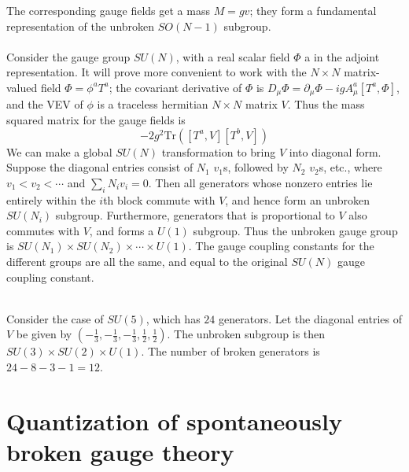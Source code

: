 \documentclass[cyan]{elegantnote}
\begin{document}
The corresponding gauge fields get a mass $M = gv$; they form a fundamental representation of the unbroken $SO(N-1)$ subgroup.
\\ \\
Consider the gauge group $SU(N)$, with a real scalar field $\Phi$ a in the adjoint representation. It will prove more convenient to work with the $N \times N$ matrix-valued field $\Phi = \phi^a T^a$; the covariant derivative of $\Phi$ is $D_{\mu}\Phi = \partial_{\mu}\Phi - igA^a_{\mu}[T^a,\Phi]$,
and the VEV of $\phi$ is a traceless hermitian $N \times N$ matrix $V$. Thus the mass squared matrix for the gauge fields is
\[-2g^2 \mathrm{Tr}\left([T^a,V][T^b,V]\right)\]
We can make a global $SU(N)$ transformation to bring $V$ into diagonal form. Suppose the diagonal entries consist of $N_1$ $v_1$s, followed by $N_2$ $v_2$s, etc.,
where $v_1 < v_2 < \cdots$ and $\sum_i N_i v_i = 0$. 
Then all generators whose nonzero entries lie entirely within the $i$th block commute with $V$, and hence form an
unbroken $SU(N_i)$ subgroup. Furthermore, generators that is proportional to $V$ also commutes with $V$, and forms a
$U(1)$ subgroup. Thus the unbroken gauge group is $SU(N_1)\times SU(N_2) \times \cdots \times U(1)$. The gauge coupling constants for the different groups are all the same, and equal to the original $SU(N)$ gauge coupling constant.
\\ \\
\begin{example}
Consider the case of $SU(5)$, which has $24$ generators. Let the diagonal entries of $V$ be given by $(-\frac{1}{3},-\frac{1}{3},-\frac{1}{3}, \frac{1}{2}, \frac{1}{2})$. The unbroken subgroup is then $SU(3) \times SU(2) \times U(1)$. The number of broken generators is $24 - 8 - 3 - 1 = 12$.
\end{example}

\section{Quantization of spontaneously broken gauge theory}
\end{document}
